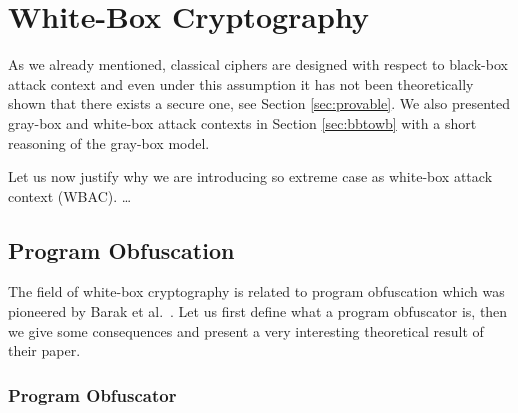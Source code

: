 
\section{White-Box Cryptography}


As we already mentioned, classical ciphers are designed with respect to black-box attack context and even under this assumption it has not been theoretically shown that there exists a secure one, see Section \ref{sec:provable}. We also presented gray-box and white-box attack contexts in Section \ref{sec:bbtowb} with a short reasoning of the gray-box model.

Let us now justify why we are introducing so extreme case as white-box attack context (WBAC). \ldots



\subsection{Program Obfuscation}
\label{sec:impos}

The field of white-box cryptography is related to program obfuscation which was pioneered by Barak et al.\ \cite{barak2001possibility}. Let us first define what a program obfuscator is, then we give some consequences and present a very interesting theoretical result of their paper.

\subsubsection{Program Obfuscator}
	
